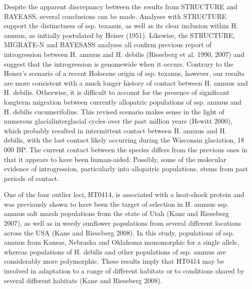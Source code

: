 \documentclass[11pt]{article}
\begin{document}
\begin{enumerate}
Despite the apparent discrepancy between the results
from STRUCTURE and BAYEASS, several conclusions
can be made. Analyses with STRUCTURE support the
distinctness of ssp. texanus, as well as its clear inclusion
within H. annuus, as initially postulated by Heiser (1951).
Likewise, the STRUCTURE, MIGRATE-N and BAYESASS
analyses all confirm previous report of introgression
between H. annuus and H. debilis (Rieseberg et al.
1990, 2007) and suggest that the introgression is genomewide
when it occurs. Contrary to the Heiser’s scenario of
a recent Holocene origin of ssp. texanus, however, our
results are more consistent with a much longer history of
contact between H. annuus and H. debilis. Otherwise, it is
difficult to account for the presence of significant longterm
migration between currently allopatric populations
of ssp. annuus and H. debilis cucumerifolius. This revised
scenario makes sense in the light of numerous glacialinterglacial
cycles over the past million years (Hewitt
2000), which probably resulted in intermittent contact
between H. annuus and H. debilis, with the last contact
likely occurring during the Wisconsin glaciation,
18 000 BP. The current contact between the species differs
from the previous ones in that it appears to have been
human-aided. Possibly, some of the molecular evidence
of introgression, particularly into allopatric populations,
stems from past periods of contact.

One of the four outlier loci, HT0414, is associated
with a heat-shock protein and was previously shown to
have been the target of selection in H. annuus ssp. annuus
salt marsh populations from the state of Utah
(Kane and Rieseberg 2007), as well as in weedy sunflower populations
from several different locations across the USA
(Kane and Rieseberg 2008). In this study, populations of
ssp. annuus from Kansas, Nebraska and Oklahoma
monomorphic for a single allele, whereas populations
of H. debilis and other populations of ssp. annuus are
considerably more polymorphic. These results imply
that HT0414 may be involved in adaptation to a range
of different habitats or to conditions shared by several
different habitats (Kane and Rieseberg 2008).














\end{enumerate}
\end{document}
